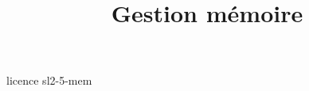 \documentclass [xcolor=table] {beamer}
\title {Gestion mémoire}
\begin{document}
 {licence}
 {sl2-5-mem}
\end{document}
